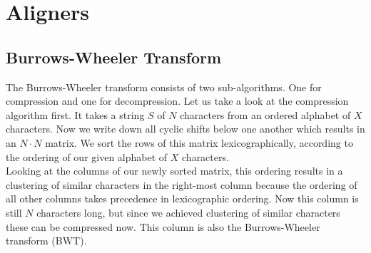 \documentclass[conference]{IEEEtran}
\begin{document}
\section{Aligners}

\subsection{Burrows-Wheeler Transform}
The Burrows-Wheeler transform consists of two sub-algorithms. One for compression and one for decompression. Let us take a look at the compression algorithm first. It takes a string $S$ of $N$ characters from an ordered alphabet of $X$ characters. Now we write down all cyclic shifts below one another which results in an $N \cdot N$ matrix. We sort the rows of this matrix lexicographically, according to the ordering of our given alphabet of $X$ characters. \\
Looking at the columns of our newly sorted matrix, this ordering results in a clustering of similar characters in the right-most column because the ordering of all other columns takes precedence in lexicographic ordering. Now this column is still $N$ characters long, but since we achieved clustering of similar characters these can be compressed now. This column is also the Burrows-Wheeler transform (BWT)\cite{burrows1994blocksorting}.


\vspace{0.5cm}
\end{document}
